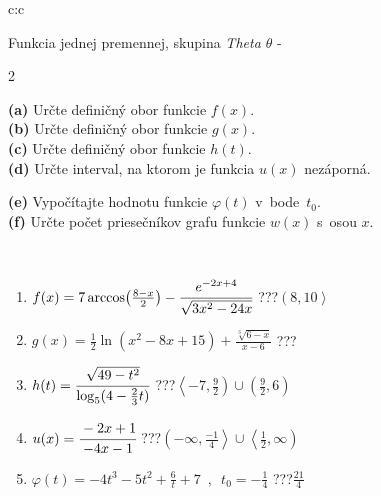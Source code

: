 \documentclass[10pt]{report}
\begin{document}
\begin{tabular}{c:c}
\begin{minipage}[c][104.5mm][t]{0.5\linewidth}
\begin{center}
\vspace{7mm}
{\huge Funkcia jednej premennej, skupina \textit{Theta $\theta$} -}\\[5mm]
\begin{minipage}{0.95\linewidth}
\begin{center}
{\small \begin{multicols}{2} \raggedright
\textbf{(a)} Určte definičný obor funkcie \(f(x)\). \\[1mm]
\textbf{(b)} Určte definičný obor funkcie \(g(x)\). \\[1mm]
\textbf{(c)} Určte definičný obor funkcie \(h(t)\). \\[1mm]
\textbf{(d)} Určte interval, na ktorom je funkcia \(u(x)\) nezáporná. \par \columnbreak
\textbf{(e)} Vypočítajte hodnotu funkcie \(\varphi(t)\) v~bode~\(t_0\). \\[1mm]
\textbf{(f)} Určte počet priesečníkov grafu funkcie \(w(x)\) s~osou \(x\). \\[1mm]
\end{multicols}
}
\end{center}
\end{minipage}
\\[4mm]
\begin{minipage}{0.79\linewidth}
\begin{center}
\begin{varwidth}{\linewidth}
\begin{enumerate}
\small
\item $f(x) = 7\arccos\!\left( \frac{8-x}{2} \right) - \cfrac{e^{-2x+4}}{\sqrt{3x^2-24x}}$\quad \dotfill\; ???\;\dotfill \quad $\left(8 , 10\right\rangle$
\item $g(x) = \frac{1}{2} \ln{\!(x^2-8x+15)}+\frac{\sqrt[3]{6-x}}{x-6}$\quad \dotfill\; ???\;\dotfill {}
\item $h(t) = \cfrac{\sqrt{49-t^2}}{\log_5(4-\frac{2}{3}t)}$\quad \dotfill\; ???\;\dotfill \quad $\left\langle-7 , \frac{9}{2}\right)\cup\left(\frac{9}{2} , 6\right)$
\item $u(x) = \cfrac{-2x+1}{-4x-1}$\quad \dotfill\; ???\;\dotfill \quad $\left(-\infty , \frac{-1}{4}\right\rangle\cup\left\langle\frac{1}{2} , \infty\right)$
\item $\varphi(t) = -4t^3-5t^2+\frac{6}{t}+7 \enspace , \enspace t_0=-\frac{1}{4}$\quad \dotfill\; ???\;\dotfill \quad $\frac{21}{4}$

\end{enumerate}
\end{varwidth}
\end{center}
\end{minipage}
\end{center}
\end{minipage}
\end{tabular}
\end{document}
